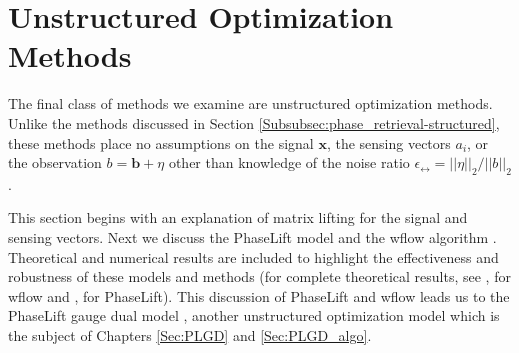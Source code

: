 \section{Unstructured Optimization Methods}	 	\label{Subsubsec:phase_retrieval-unstructured}


The final class of methods we examine are unstructured optimization methods.  Unlike the methods discussed in Section \ref{Subsubsec:phase_retrieval-structured}, these methods place no assumptions on the signal $\mathbf{x}$, the sensing vectors $a_i$, or the observation $b = \mathbf{b} + \eta$ other than knowledge of the noise ratio $\epsilon_\rel = ||\eta||_2 / ||b||_2$.

This section begins with an explanation of matrix lifting for the signal and sensing vectors.  
Next we discuss the PhaseLift model \cite{DBLP:journals/siamis/CandesESV13} and the wflow algorithm \cite{DBLP:journals/tit/CandesLS15}.   
Theoretical and numerical results are included to highlight the effectiveness and robustness of these models and methods (for complete theoretical results, see \cite{DBLP:journals/tit/CandesLS15},  \cite{sun2016geometric} for wflow and \cite{candes2014solving}, \cite{candes2013phaselift} for PhaseLift).  
This discussion of PhaseLift and wflow leads us to the PhaseLift gauge dual model \cite{DBLP:journals/siamsc/FriedlanderM16}, another unstructured optimization model which is the subject of Chapters \ref{Sec:PLGD} and \ref{Sec:PLGD_algo}.






